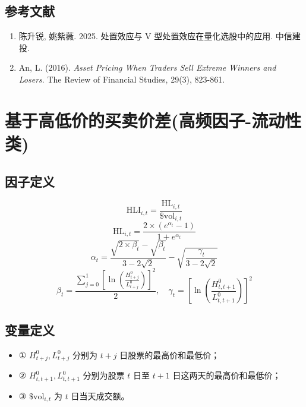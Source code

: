 \documentclass{article}
\begin{document}
\subsection{参考文献}
\begin{enumerate}
    \item 陈升锐, 姚紫薇. 2025. 处置效应与 V 型处置效应在量化选股中的应用. 中信建投.
    \item An, L. (2016). \textit{Asset Pricing When Traders Sell Extreme Winners and Losers}. The Review of Financial Studies, 29(3), 823-861.
\end{enumerate}

\section{基于高低价的买卖价差(高频因子-流动性类)}

\subsection{因子定义}
\begin{equation}
    \mathrm{HLI}_{i,t} = \frac{\mathrm{HL}_{i,t}}{\$ \mathrm{vol}_{i,t}}
\end{equation}
\begin{equation}
    \mathrm{HL}_{i,t} = \frac{2 \times (e^{\alpha_t} - 1)}{1 + e^{\alpha_t}}
\end{equation}
\begin{equation}
    \alpha_t = \frac{\sqrt{2 \times \beta_t} - \sqrt{\beta_t}}{3 - 2\sqrt{2}} - \sqrt{\frac{\gamma_t}{3 - 2\sqrt{2}}}
\end{equation}
\begin{equation}
    \beta_t = \frac{\sum_{j=0}^{1} \left[ \ln \left( \frac{H_{t+j}^0}{L_{t+j}^0} \right) \right]^2}{2}, \quad \gamma_t = \left[ \ln \left( \frac{H_{t,t+1}^0}{L_{t,t+1}^0} \right) \right]^2
\end{equation}

\subsection{变量定义}
\begin{itemize}
    \item ① \( H_{t+j}^0, L_{t+j}^0 \) 分别为 \( t+j \) 日股票的最高价和最低价；
    \item ② \( H_{t,t+1}^0, L_{t,t+1}^0 \) 分别为股票 \( t \) 日至 \( t+1 \) 日这两天的最高价和最低价；
    \item ③ \( \$ \mathrm{vol}_{i,t} \) 为 \( t \) 日当天成交额。
\end{itemize}
\end{document}

